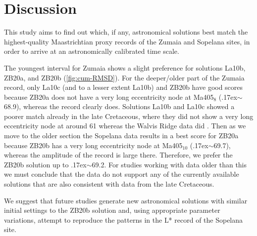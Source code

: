 \documentclass[draft]{agujournal2019}
\newcommand{\appr}{\raise.17ex\hbox{$\scriptstyle\sim$}} %
\newcommand{\ijk}{\textcolor{blue}}
\begin{document}
\section{Discussion}\label{sec:discussion}

This study aims to find out which, if any, astronomical solutions best match the highest-quality Maastrichtian proxy records of the Zumaia and Sopelana sites, in order to arrive at an astronomically calibrated time scale.

The youngest interval for Zumaia shows a slight preference for solutions La10b, ZB20a, and ZB20b (\cref{fig:cum-RMSD}).
For the deeper/older part of the Zumaia record, only La10c (and to a lesser extent La10b) and ZB20b have good scores because ZB20a does not have a very long eccentricity node at Ma405\(_{8}\) (\appr\qty{68.9}{\millionyearago}), whereas the record clearly does.
Solutions La10b and La10c showed a poorer match already in the late Cretaceous, where they did not show a very long eccentricity node at around \qty{61}{\millionyearago} whereas the Walvis Ridge data did \cite{ZeebeLourens2022EPSL}.
Then as we move to the older section the Sopelana data results in a best score for ZB20a because ZB20b has a very long eccentricity node at Ma405\(_{10}\) (\appr\qty{69.7}{\millionyearago}), whereas the amplitude of the record is large there.
Therefore, we prefer the ZB20b solution up to \appr\qty{69.2}{\millionyearago}.
For studies working with data older than this we must conclude that the data do not support any of the currently available solutions that are also consistent with data from the late Cretaceous.

We suggest that future studies generate new astronomical solutions with similar initial settings to the ZB20b solution and, using appropriate parameter variations, attempt to reproduce the patterns in the \gls{L*} record of the Sopelana site.




\end{document}
